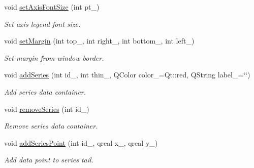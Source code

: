 \begin{DoxyCompactItemize}
void \mbox{\hyperlink{classeven_1_1_chart_ae4c222a4d6c6fc39b1ce3a75fb895e71}{set\+Axis\+Font\+Size}} (int pt\+\_\+)
\begin{DoxyCompactList}\small\item\em Set axis legend font size. \end{DoxyCompactList}\item 
\mbox{\label{classeven_1_1_chart_af5e9b8d09719461dfe313ba236969ca1}} 
void \mbox{\hyperlink{classeven_1_1_chart_af5e9b8d09719461dfe313ba236969ca1}{set\+Margin}} (int top\+\_\+, int right\+\_\+, int bottom\+\_\+, int left\+\_\+)
\begin{DoxyCompactList}\small\item\em Set margin from window border. \end{DoxyCompactList}\item 
\mbox{\label{classeven_1_1_chart_a05a6afbe1196c8f9508e2d57161a9954}} 
void \mbox{\hyperlink{classeven_1_1_chart_a05a6afbe1196c8f9508e2d57161a9954}{add\+Series}} (int id\+\_\+, int thin\+\_, Q\+Color color\+\_\+=Qt\+::red, Q\+String label\+\_\+=\char`\"{}\char`\"{})
\begin{DoxyCompactList}\small\item\em Add series data container. \end{DoxyCompactList}\item 
\mbox{\label{classeven_1_1_chart_abc4a68f82ac4d14fd679a9f0e8126101}} 
void \mbox{\hyperlink{classeven_1_1_chart_abc4a68f82ac4d14fd679a9f0e8126101}{remove\+Series}} (int id\+\_\+)
\begin{DoxyCompactList}\small\item\em Remove series data container. \end{DoxyCompactList}\item 
\mbox{\label{classeven_1_1_chart_a3fcfba2977d34f3e70a8ce7423064cac}} 
void \mbox{\hyperlink{classeven_1_1_chart_a3fcfba2977d34f3e70a8ce7423064cac}{add\+Series\+Point}} (int id\+\_\+, qreal x\+\_\+, qreal y\+\_\+)
\begin{DoxyCompactList}\small\item\em Add data point to series tail. \end{DoxyCompactList}\item 
\mbox{\label{classeven_1_1_chart_a8b7c917c9da710f11a459ac917428af1}} 

\end{DoxyCompactItemize}
